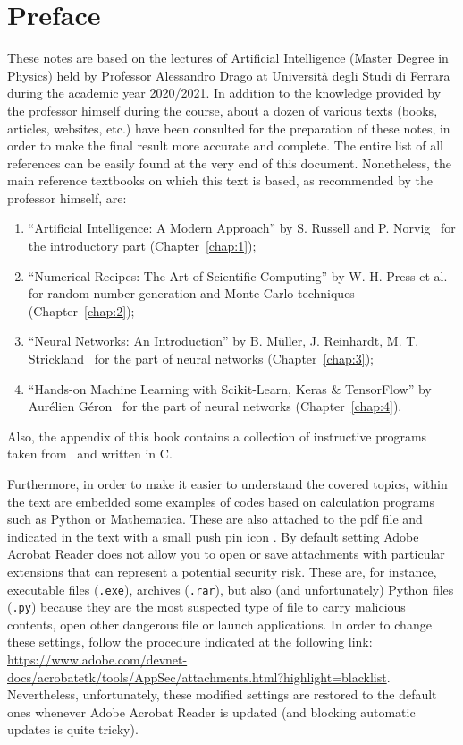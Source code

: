 \documentclass[11pt,openany,twoside,a4paper]{book}
\renewcommand{\chaptermark}[1]{\markboth{\thechapter~#1}{}}
\numberwithin{equation}{section}		%
\begin{document}
{\renewcommand{\chaptermark}[1]{\markboth{#1}{}}
\chapter{Preface}
These notes are based on the lectures of Artificial Intelligence (Master Degree in Physics) held by Professor Alessandro Drago at Università degli Studi di Ferrara during the academic year 2020/2021. In addition to the knowledge provided by the professor himself during the course, about a dozen of various texts (books, articles, websites, etc.) have been consulted for the preparation of these notes, in order to make the final result more accurate and complete. The entire list of all references can be easily found at the very end of this document. Nonetheless, the main reference textbooks on which this text is based, as recommended by the professor himself, are:
\begin{enumerate}
\item ``Artificial Intelligence: A Modern Approach'' by S. Russell and P. Norvig~\cite{RussellNorvig3,RussellNorvig4} for the introductory part (Chapter~\ref{chap:1});
\item ``Numerical Recipes: The Art of Scientific Computing'' by W. H. Press et al.~\cite{Recipes} for random number generation and Monte Carlo techniques (Chapter~\ref{chap:2});
\item ``Neural Networks: An Introduction'' by B. Müller, J. Reinhardt, M. T. Strickland~\cite{MRS} for the part of neural networks (Chapter~\ref{chap:3});
\item ``Hands-on Machine Learning with Scikit-Learn, Keras \& TensorFlow'' by Aurélien Géron~\cite{Geron1,Geron2} for the part of neural networks (Chapter~\ref{chap:4}).
\end{enumerate}
Also, the appendix of this book contains a collection of instructive programs taken from~\cite{MRS} and written in C.

Furthermore, in order to make it easier to understand the covered topics, within the text are embedded some examples of codes based on calculation programs such as Python or Mathematica. These are also attached to the pdf file and indicated in the text with a small push pin icon . By default setting Adobe Acrobat Reader does not allow you to open or save attachments with particular extensions that can represent a potential security risk. These are, for instance, executable files (\texttt{.exe}), archives (\texttt{.rar}), but also (and unfortunately) Python files (\texttt{.py}) because they are the most suspected type of file to carry malicious contents, open other dangerous file or launch applications. In order to change these settings, follow the procedure indicated at the following link: \url{https://www.adobe.com/devnet-docs/acrobatetk/tools/AppSec/attachments.html?highlight=blacklist}. Nevertheless, unfortunately, these modified settings are restored to the default ones whenever Adobe Acrobat Reader is updated (and blocking automatic updates is quite tricky).

}
\end{document}
